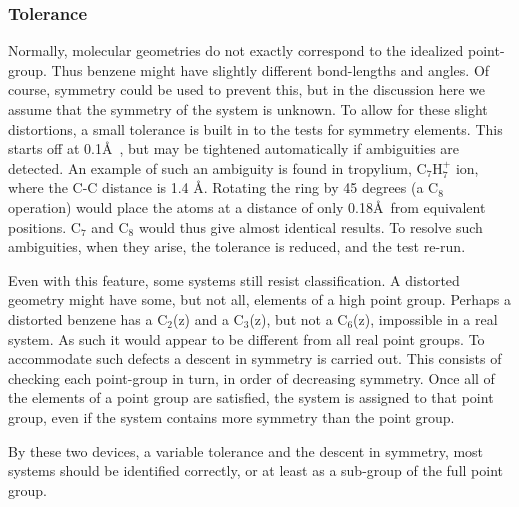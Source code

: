 \subsubsection*{Tolerance}
Normally, molecular geometries do not exactly correspond to the idealized
point-group.  Thus benzene might have slightly different bond-lengths and
angles.  Of course, symmetry could be used to prevent this, but in the
discussion here we assume that the symmetry of the system is unknown.  To allow
for these slight distortions, a small tolerance is built in to the tests for
symmetry elements. This starts off at 0.1\AA\ , but may be tightened
automatically if ambiguities are detected.  An example of such an ambiguity is
found in tropylium, C$_7$H$_7^+$ ion, where the C-C distance is 1.4 \AA .
Rotating the ring by 45 degrees (a C$_8$ operation) would place the atoms at a
distance of only 0.18\AA\  from equivalent positions.  C$_7$ and C$_8$ would
thus  give almost identical results.  To resolve such ambiguities, when they
arise, the tolerance is reduced, and the test re-run.

Even with this feature, some systems still resist classification.   A distorted
geometry might have some, but not all, elements of a high point group.  Perhaps
a distorted benzene has a C$_2$(z) and a C$_3$(z), but  not a C$_6$(z), 
impossible in a real system.  As such it would appear to be different from all
real point groups.  To accommodate such defects a descent in symmetry is
carried out.  This consists of checking each point-group in turn, in order of
decreasing symmetry.  Once all of the elements of a point group are satisfied,
the system is assigned to that point group, even if the system contains more
symmetry than the point group.

By these two devices, a variable tolerance and the descent in symmetry, most
systems should be identified correctly, or at least as a sub-group of the full
point group.


